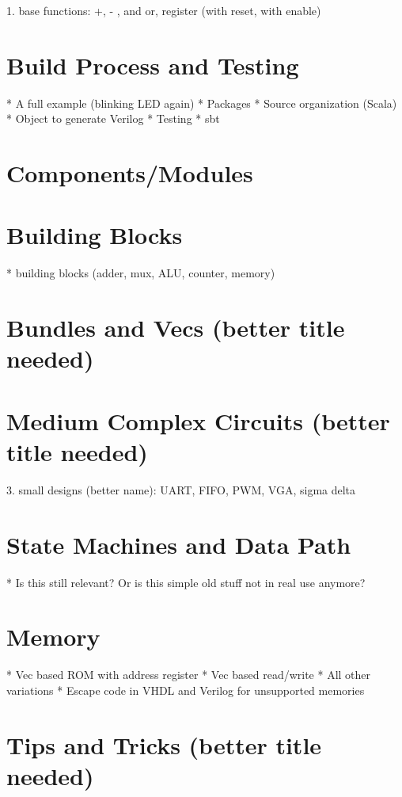 \documentclass[%
    10pt, %
    headinclude, footexclude,
    openright, %
    notitlepage,
    cleardoubleempty,
    headsepline,
    pointlessnumbers,
    bibtotoc, idxtotoc,
    ]{scrbook}
\begin{document}
1. base functions: +, - , and or, register (with reset, with enable)


\section{Build Process and Testing}

 * A full example (blinking LED again)
 * Packages
 * Source organization (Scala)
 * Object to generate Verilog
 * Testing
 * sbt

\section{Components/Modules}

\section{Building Blocks}

 * building blocks (adder, mux, ALU, counter, memory)

\section{Bundles and Vecs (better title needed)}

\section{Medium Complex Circuits (better title needed)}

3. small designs (better name): UART, FIFO, PWM, VGA, sigma delta

\section{State Machines and Data Path}

 * Is this still relevant? Or is this simple old stuff not in real use anymore?

\section{Memory}

 * Vec based ROM with address register
 * Vec based read/write
 * All other variations
 * Escape code in VHDL and Verilog for unsupported memories

\section{Tips and Tricks (better title needed)}
\end{document}
